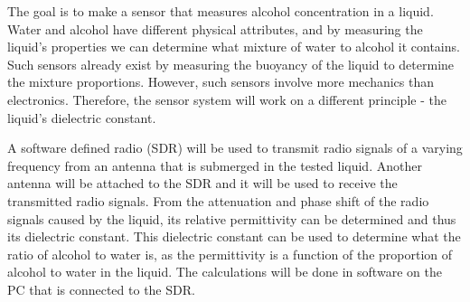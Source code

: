 
The goal is to make a sensor that measures alcohol concentration in a liquid.
Water and alcohol have different physical attributes, and by measuring the liquid's properties we can determine what mixture of water to alcohol it contains.
Such sensors already exist by measuring the buoyancy of the liquid to determine the mixture proportions.
However, such sensors involve more mechanics than electronics.
Therefore, the sensor system will work on a different principle - the liquid's dielectric constant.

A software defined radio (SDR) will be used to transmit radio signals of a varying frequency from an antenna that is submerged in the tested liquid.
Another antenna will be attached to the SDR and it will be used to receive the transmitted radio signals.
From the attenuation and phase shift of the radio signals caused by the liquid, its relative permittivity can be determined and thus its dielectric constant.
This dielectric constant can be used to determine what the ratio of alcohol to water is, as the permittivity is a function of the proportion of alcohol to water in the liquid.
The calculations will be done in software on the PC that is connected to the SDR.